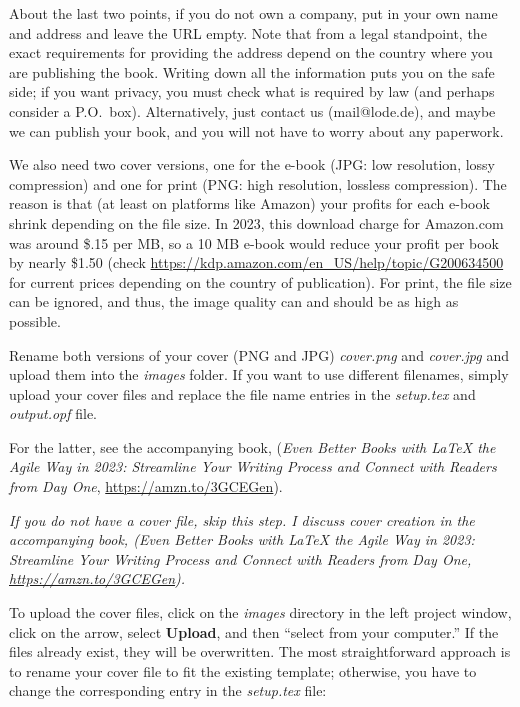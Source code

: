 About the last two points, if you do not own a company, put in your own name and address and leave the URL empty. Note that from a legal standpoint, the exact requirements for providing the address depend on the country where you are publishing the book. Writing down all the information puts you on the safe side; if you want privacy, you must check what is required by law (and perhaps consider a P.O.~box). Alternatively, just contact us (mail@lode.de), and maybe we can publish your book, and you will not have to worry about any paperwork.

We also need two cover versions, one for the e-book (JPG: low resolution, lossy compression) and one for print (PNG: high resolution, lossless compression). The reason is that (at least on platforms like Amazon) your profits for each e-book shrink depending on the file size. In 2023, this download charge for Amazon.com was around \${}.15 per MB, so a 10 MB e-book would reduce your profit per book by nearly \${}1.50 (check \url{https://kdp.amazon.com/en_US/help/topic/G200634500} for current prices depending on the country of publication). For print, the file size can be ignored, and thus, the image quality can and should be as high as possible. 

Rename both versions of your cover (PNG and JPG) \textit{cover.png} and \textit{cover.jpg} and upload them into the \textit{images} folder. If you want to use different filenames, simply upload your cover files and replace the file name entries in the \textit{setup.tex} and \textit{output.opf} file.

For the latter, see the accompanying book, (\textit{Even Better Books with LaTeX the Agile Way in 2023: Streamline Your Writing Process and Connect with Readers from Day One}, \url{https://amzn.to/3GCEGen}).

\textit{If you do not have a cover file, skip this step. I discuss cover creation in the accompanying book, (\textit{Even Better Books with LaTeX the Agile Way in 2023: Streamline Your Writing Process and Connect with Readers from Day One}, \url{https://amzn.to/3GCEGen}).}

To upload the cover files, click on the \textit{images} directory in the left project window, click on the arrow, select \textbf{Upload}, and then ``select from your computer.'' If the files already exist, they will be overwritten. The most straightforward approach is to rename your cover file to fit the existing template; otherwise, you have to change the corresponding entry in the \textit{setup.tex} file:

